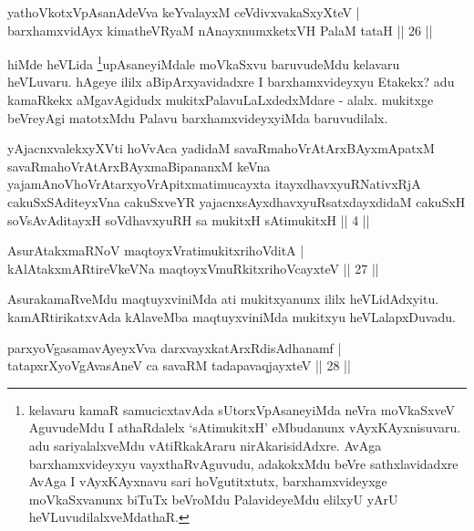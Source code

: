 \begin{shl}
yathoVkotxVpAsanAdeVva keYvalayxM ceVdivxvakaSxyXteV |\\
barxhamxvidAyx kimatheVRyaM nAnayxnumxketxVH PalaM tataH \hfill || 26 ||
\end{shl}

\begin{artha}
hiMde heVLida \footnote{kelavaru kamaR samucicxtavAda sUtorxVpAsaneyiMda neVra moVkaSxveV AguvudeMdu I athaRdalelx `sAtimukitxH' eMbudanunx vAyxKAyxnisuvaru. adu sariyalalxveMdu vAtiRkakAraru nirAkarisidAdxre. AvAga barxhamxvideyxyu vayxthaRvAguvudu, adakokxMdu beVre sathxlavidadxre AvAga I vAyxKAyxnavu sari hoVgutitxtutx, barxhamxvideyxge moVkaSxvanunx biTuTx beVroMdu PalavideyeMdu elilxyU yArU heVLuvudilalxveMdathaR.}upAsaneyiMdale moVkaSxvu baruvudeMdu kelavaru heVLuvaru. hAgeye ililx aBipArxyavidadxre I barxhamxvideyxyu Etakekx? adu kamaRkekx aMgavAgidudx mukitxPalavuLaLxdedxMdare - alalx. mukitxge beVreyAgi matotxMdu Palavu barxhamxvideyxyiMda baruvudilalx.
\end{artha}


\begin{kandikeshl}
yAjacnxvalekxyXVti hoVvAca yadidaM savaRmahoVrAtArxBAyxmApatxM savaRmahoVrAtArxBAyxmaBipananxM keVna yajamAnoV\s hoVrAtarxyoVrApitxmatimucayxta itayxdhavxyuRNativxRjA cakuSxSAditeyxVna cakuSxveYR yajacnxsAyxdhavxyuRsatxdayxdidaM cakuSxH soV\s sAvAditayxH soV\s dhavxyuRH sa mukitxH sAtimukitxH || 4 ||
\end{kandikeshl}

\begin{shl}
AsurAtakxmaRNoV maqtoyxVratimukitxrihoVditA |\\
kAlAtakxmARtireVkeVNa maqtoyxVmuRkitxrihoVcayxteV \hfill || 27 ||
\end{shl}

\begin{artha}
AsurakamaRveMdu maqtuyxviniMda ati mukitxyanunx ililx heVLidAdxyitu. kamARtirikatxvAda kAlaveMba maqtuyxviniMda mukitxyu heVLalapxDuvadu.
\end{artha}


\begin{shl}
parxyoVgasamavAyeyxVva darxvayxkatArxRdisAdhanamf |\\
tatapxrXyoVgAvasAneV ca savaRM tadapavaqjayxteV \hfill || 28 ||
\end{shl}

